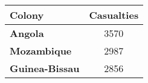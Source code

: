 
\begin{tabular}{>{}lc}
\toprule
\textbf{Colony} & \textbf{Casualties}\\
\midrule
\textbf{Angola} & 3570\\
\textbf{Mozambique} & 2987\\
\textbf{Guinea-Bissau} & 2856\\
\bottomrule
\end{tabular}
